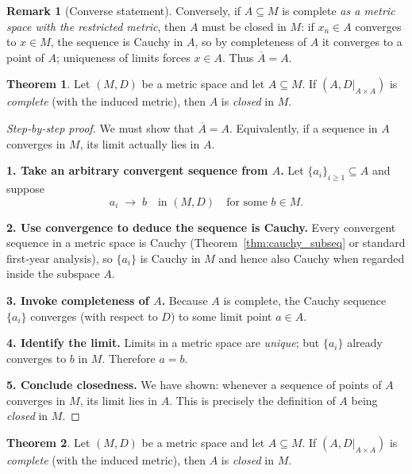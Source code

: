 \documentclass[12pt]{article}
\theoremstyle{definition} %
\newtheorem{theorem}{Theorem}
\newtheorem{remark}{Remark}
\theoremstyle{plain} %
\begin{document}
\begin{remark}[Converse statement]
  Conversely, if $A\subseteq M$ is complete \emph{as a metric space with the
  restricted metric}, then $A$ must be closed in $M$:
  if $x_n\in A$ converges to $x\in M$, the sequence is Cauchy in $A$,
  so by completeness of $A$ it converges to a point of $A$; uniqueness of
  limits forces $x\in A$.  Thus $\overline{A}=A$.
\end{remark}
\begin{theorem}\label{thm:complete_impl_closed}
  Let $(M,D)$ be a metric space and let $A\subseteq M$.  
  If $(A,D|_{A\times A})$ is \emph{complete} (with the induced metric),
  then $A$ is \emph{closed} in $M$.
\end{theorem}

\begin{proof}[Step‑by‑step proof]
  We must show that \(\overline{A}=A\).  
  Equivalently, if a sequence in \(A\) converges in \(M\), its limit
  actually lies in \(A\).

  \smallskip
  \textbf{1.  Take an arbitrary convergent sequence from \(A\).}  
  Let \(\{a_i\}_{i\ge1}\subseteq A\) and suppose
  \[
      a_i \;\longrightarrow\; b
      \quad\text{in } (M,D)
      \quad\text{for some }b\in M.
  \]

  \smallskip
  \textbf{2.  Use convergence to deduce the sequence is Cauchy.}  
  Every convergent sequence in a metric space is Cauchy
  (Theorem \ref{thm:cauchy_subseq} or standard first‑year analysis),
  so \(\{a_i\}\) is Cauchy in \(M\) and hence also Cauchy when regarded
  inside the subspace \(A\).

  \smallskip
  \textbf{3.  Invoke completeness of \(A\).}  
  Because \(A\) is complete, the Cauchy sequence \(\{a_i\}\)
  converges (with respect to \(D\)) to some limit point \(a\in A\).

  \smallskip
  \textbf{4.  Identify the limit.}  
  Limits in a metric space are \emph{unique}; but \(\{a_i\}\) already
  converges to \(b\) in \(M\).
  Therefore \(a=b\).

  \smallskip
  \textbf{5.  Conclude closedness.}  
  We have shown: whenever a sequence of points of \(A\) converges in \(M\),
  its limit lies in \(A\).  
  This is precisely the definition of \(A\) being \emph{closed} in \(M\).
\end{proof}
\begin{theorem}\label{thm:complete_impl_closed}
  Let $(M,D)$ be a metric space and let $A\subseteq M$.  
  If $(A,D|_{A\times A})$ is \emph{complete} (with the induced metric),
  then $A$ is \emph{closed} in $M$.
\end{theorem}
\end{document}
